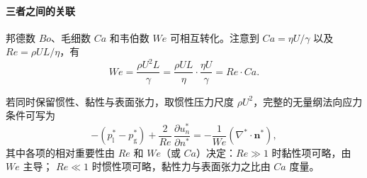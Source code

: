 \paragraph{三者之间的关联}

邦德数 $Bo$、毛细数 $Ca$ 和韦伯数 $We$ 可相互转化。注意到 $Ca = \eta U/\gamma$ 以及 $Re = \rho U L/\eta$，有
\[
We = \frac{\rho U^2 L}{\gamma} = \frac{\rho U L}{\eta} \cdot \frac{\eta U}{\gamma} = Re \cdot Ca.
\]

若同时保留惯性、黏性与表面张力，取惯性压力尺度 $\rho U^2$，完整的无量纲法向应力条件可写为
\begin{equation}
    -(p_{\text{l}}^* - p_{\text{g}}^*) + \frac{2}{Re}\,\frac{\partial u_n^*}{\partial n^*} = -\frac{1}{We} (\nabla^* \cdot \mathbf{n}^*),
    \label{eq:full_normal_stress}
\end{equation}
其中各项的相对重要性由 $Re$ 和 $We$（或 $Ca$）决定：$Re \gg 1$ 时黏性项可略，由 $We$ 主导；
$Re \ll 1$ 时惯性项可略，黏性力与表面张力之比由 $Ca$ 度量。


























\ifx\allfiles\undefined

\fi